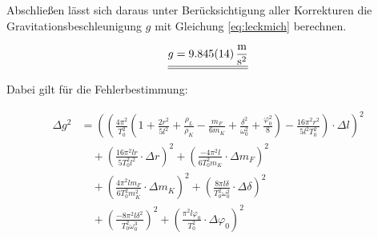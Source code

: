 Abschließen lässt sich daraus unter Berücksichtigung aller Korrekturen die Gravitationsbeschleunigung $g$ mit Gleichung \ref{eq:leckmich} berechnen.

\[\underline{\underline{g = \SI{9,845 \pm 0,014}{\frac{\meter}{\second^2}}}}\]

Dabei gilt für die Fehlerbestimmung:

\begin{align}
\Delta g^{2} 
&= \left( 
    \left( 
        \frac{4\pi^{2}}{T_{0}^{2}}
        \left( 
            1 + \frac{2r^{2}}{5l^{2}} + \frac{\rho_{L}}{\rho_{K}} 
            - \frac{m_{F}}{6m_{K}} + \frac{\delta^{2}}{\omega_{0}^{2}} 
            + \frac{\varphi_{0}^{2}}{8} 
        \right) 
        - \frac{16\pi^{2}r^{2}}{5l^{2}T_{0}^{2}} 
    \right) \cdot \Delta l 
\right)^{2} \\[1ex]
&\quad + \left( 
    \frac{16\pi^{2}lr}{5T_{0}^{2}l^{2}} \cdot \Delta r 
\right)^{2} 
+ \left( 
    \frac{-4\pi^{2}l}{6T_{0}^{2}m_{K}} \cdot \Delta m_{F} 
\right)^{2} \\[1ex]
&\quad + \left( 
    \frac{4\pi^{2}lm_{F}}{6T_{0}^{2}m_{K}^{2}} \cdot \Delta m_{K} 
\right)^{2} 
+ \left( 
    \frac{8\pi l \delta}{T_{0}^{2}\omega_{0}^{2}} \cdot \Delta \delta 
\right)^{2} \\[1ex]
&\quad + \left( 
    \frac{-8\pi^{2}l\delta^{2}}{T_{0}^{2}\omega_{0}^{3}} 
\right)^{2} 
+ \left( 
    \frac{\pi^{2}l\varphi_{0}}{T_{0}^{2}} \cdot \Delta \varphi_{0} 
\right)^{2}
\end{align}
